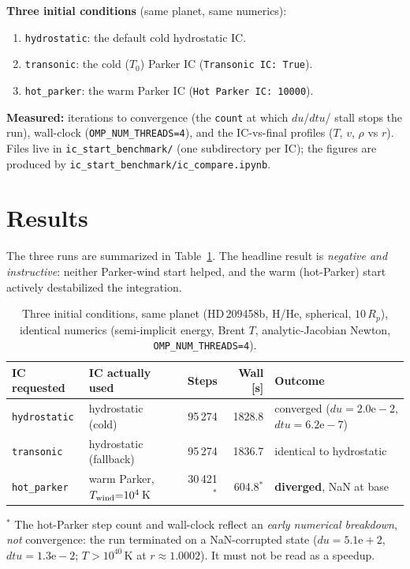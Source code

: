 \documentclass[english,a4paper]{my_memo}
\begin{document}
\textbf{Three initial conditions} (same planet, same numerics):
\begin{enumerate}\itemsep1pt
\item \texttt{hydrostatic}: the default cold hydrostatic IC.
\item \texttt{transonic}: the cold ($T_0$) Parker IC (\texttt{Transonic IC: True}).
\item \texttt{hot\_parker}: the warm Parker IC (\texttt{Hot Parker IC: 10000}).
\end{enumerate}

\textbf{Measured:} iterations to convergence (the \texttt{count} at which $du$/$dtu$/
stall stops the run), wall-clock (\texttt{OMP\_NUM\_THREADS=4}), and the IC-vs-final
profiles ($T$, $v$, $\rho$ vs $r$). Files live in \texttt{ic\_start\_benchmark/}
(one subdirectory per IC); the figures are produced by
\texttt{ic\_start\_benchmark/ic\_compare.ipynb}.

\section{Results}
The three runs are summarized in Table~\ref{tab:icbench}. The headline result is
\emph{negative and instructive}: neither Parker-wind start helped, and the warm
(hot-Parker) start actively destabilized the integration.

\begin{table}[ht]
\centering
\caption{Three initial conditions, same planet (HD\,209458b, H/He, spherical, $10\,R_p$),
identical numerics (semi-implicit energy, Brent $T$, analytic-Jacobian Newton,
\texttt{OMP\_NUM\_THREADS=4}).}
\label{tab:icbench}
\small
\begin{tabular}{@{}llrrl@{}}
\toprule
IC requested & IC actually used & Steps & Wall [s] & Outcome \\
\midrule
\texttt{hydrostatic} & hydrostatic (cold) & 95\,274 & 1828.8 & converged ($du{=}2.0\mathrm{e}{-}2$, $dtu{=}6.2\mathrm{e}{-}7$) \\
\texttt{transonic}   & hydrostatic (fallback) & 95\,274 & 1836.7 & identical to hydrostatic \\
\texttt{hot\_parker} & warm Parker, $T_{\rm wind}{=}10^4$\,K & 30\,421$^\ast$ & 604.8$^\ast$ & \textbf{diverged}, NaN at base \\
\bottomrule
\end{tabular}

\smallskip
{\footnotesize $^\ast$ The hot-Parker step count and wall-clock reflect an \emph{early
numerical breakdown}, \emph{not} convergence: the run terminated on a NaN-corrupted
state ($du{=}5.1\mathrm{e}{+}2$, $dtu{=}1.3\mathrm{e}{-}2$; $T{>}10^{40}$\,K at $r\!\approx\!1.0002$).
It must not be read as a speedup.}
\end{table}
\end{document}
